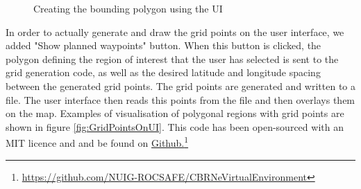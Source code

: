 \begin{figure}{}
\hspace{0.2em}
\hspace{0.2em}
\caption{Creating the bounding polygon using the UI}
\label{fig:AddClicks}
\end{figure}

In order to actually generate and draw the grid points on the user interface, we added "Show planned waypoints" button. When this button is clicked, the polygon defining the region of interest that the user has selected is sent to the grid generation code, as well as the desired latitude and longitude spacing between the generated grid points. The grid points are generated and written to a file. The user interface then reads this points from the file and then overlays them on the map. Examples of visualisation of polygonal regions with grid points are shown in figure \ref{fig:GridPointsOnUI}. This code has been open-sourced with an MIT licence and and be found on 
\href{https://github.com/NUIG-ROCSAFE/CBRNeVirtualEnvironment}{ Github.}\footnote{\href {https://github.com/NUIG-ROCSAFE/CBRNeVirtualEnvironment}{https://github.com/NUIG-ROCSAFE/CBRNeVirtualEnvironment}}

